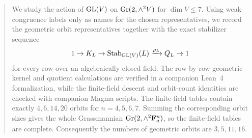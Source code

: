 \begin{abstract}
We study the action of \(\GL(V)\) on \(\Gr(2,\wedge^2 V)\) for \(\dim V\le 7\).
Using weak-congruence labels only as names for the chosen representatives, we
record the geometric orbit representatives together with the exact stabilizer
sequence
\[
  1\to K_L\to \Stab_{\GL(V)}(L)\xrightarrow{\rho_L} Q_L\to 1
\]
for every row over an algebraically closed field. The row-by-row geometric
kernel and quotient calculations are verified in a companion Lean~4
formalization, while the finite-field descent and orbit-count identities are
checked with companion Magma scripts. The finite-field tables contain exactly
\(4,6,14,20\) orbits for \(n=4,5,6,7\). Summing the corresponding orbit sizes
gives the whole Grassmannian \(\Gr(2,\wedge^2 \Fq^n)\), so the finite-field
tables are complete. Consequently the numbers of geometric orbits are
\(3,5,11,16\).
\end{abstract}
